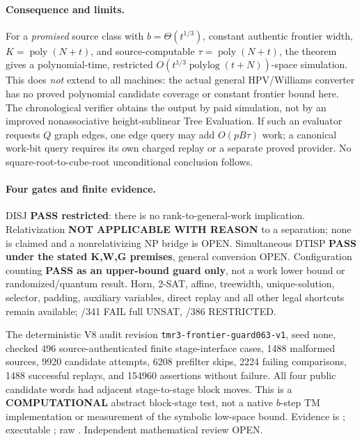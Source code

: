 \documentclass[11pt]{article}
\begin{document}
\paragraph{Consequence and limits.}
For a \emph{promised} source class with $b=\Theta(t^{1/3})$,
constant authentic frontier width, $K=\operatorname{poly}(N+t)$,
and source-computable $\tau=\operatorname{poly}(N+t)$,
the theorem gives a polynomial-time, restricted
$O(t^{1/3}\operatorname{polylog}(t+N))$-space simulation.
This does \emph{not} extend to all machines: the actual
general HPV/Williams converter has no proved polynomial
candidate coverage or constant frontier bound here.
The chronological verifier obtains the output by paid simulation,
not by an improved nonassociative height-sublinear Tree Evaluation.
If such an evaluator requests $Q$ graph edges, one edge query may
add $O(pB\tau)$ work; a canonical work-bit query requires its
own charged replay or a separate proved provider.
No square-root-to-cube-root unconditional conclusion follows.

\paragraph{Four gates and finite evidence.}
DISJ \textbf{PASS restricted}: there is no rank-to-general-work
implication. Relativization \textbf{NOT APPLICABLE WITH REASON}
to a separation; none is claimed and a nonrelativizing NP bridge
is OPEN. Simultaneous DTISP \textbf{PASS under the stated
K,W,G premises}, general conversion OPEN.
Configuration counting \textbf{PASS as an upper-bound guard
only}, not a work lower bound or randomized/quantum result.
Horn, 2-SAT, affine, treewidth, unique-solution, selector,
padding, auxiliary variables, direct replay and all other legal
shortcuts remain available; /341 FAIL full UNSAT, /386 RESTRICTED.

The deterministic V8 audit revision
\texttt{tmr3-frontier-guard063-v1}, seed none, checked 496
source-authenticated finite stage-interface cases, 1488
malformed sources, 9920 candidate attempts, 6208 prefilter skips,
2224 failing comparisons, 1488 successful replays, and
154960 assertions without failure. All four public candidate
words had adjacent stage-to-stage block moves.
This is a \textbf{COMPUTATIONAL} abstract block-stage test,
not a native $b$-step TM implementation or measurement of
the symbolic low-space bound.
Evidence is ;
executable ;
raw .
Independent mathematical review OPEN.
\end{document}
